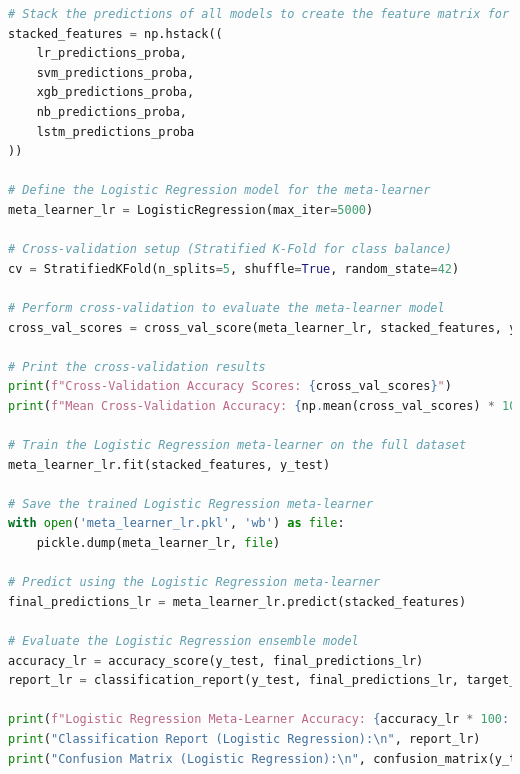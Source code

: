 \begin{tcolorbox}[colback=gray!5!white, colframe=gray!80!black, boxrule=0.5pt, title=Evaluate Meta-Learner and Ensemble Model 3]
    \begin{lstlisting}[language=Python]
# Stack the predictions of all models to create the feature matrix for the meta-learner
stacked_features = np.hstack((
    lr_predictions_proba,
    svm_predictions_proba,
    xgb_predictions_proba,
    nb_predictions_proba,
    lstm_predictions_proba
))

# Define the Logistic Regression model for the meta-learner
meta_learner_lr = LogisticRegression(max_iter=5000)

# Cross-validation setup (Stratified K-Fold for class balance)
cv = StratifiedKFold(n_splits=5, shuffle=True, random_state=42)

# Perform cross-validation to evaluate the meta-learner model
cross_val_scores = cross_val_score(meta_learner_lr, stacked_features, y_test, cv=cv, scoring='accuracy')

# Print the cross-validation results
print(f"Cross-Validation Accuracy Scores: {cross_val_scores}")
print(f"Mean Cross-Validation Accuracy: {np.mean(cross_val_scores) * 100:.2f}%")

# Train the Logistic Regression meta-learner on the full dataset
meta_learner_lr.fit(stacked_features, y_test)

# Save the trained Logistic Regression meta-learner
with open('meta_learner_lr.pkl', 'wb') as file:
    pickle.dump(meta_learner_lr, file)

# Predict using the Logistic Regression meta-learner
final_predictions_lr = meta_learner_lr.predict(stacked_features)

# Evaluate the Logistic Regression ensemble model
accuracy_lr = accuracy_score(y_test, final_predictions_lr)
report_lr = classification_report(y_test, final_predictions_lr, target_names=label_encoder.classes_)

print(f"Logistic Regression Meta-Learner Accuracy: {accuracy_lr * 100:.2f}%")
print("Classification Report (Logistic Regression):\n", report_lr)
print("Confusion Matrix (Logistic Regression):\n", confusion_matrix(y_test, final_predictions_lr))
    \end{lstlisting}
\end{tcolorbox}

